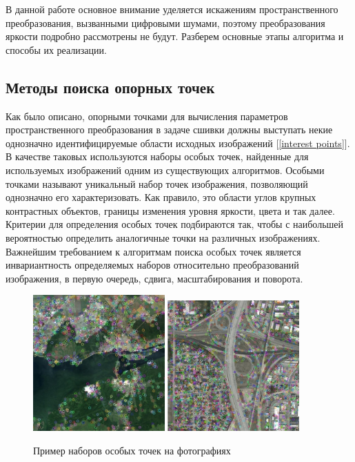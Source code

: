 {{	 В данной работе основное внимание уделяется искажениям пространственного преобразования, вызванными цифровыми шумами, поэтому преобразования яркости подробно рассмотрены не будут. 
	 Разберем основные этапы алгоритма и способы их реализации.
}
\subsection{Методы поиска опорных точек}{
	Как было описано, опорными точками для вычисления параметров пространственного преобразования в задаче сшивки должны выступать некие однозначно идентифицируемые области исходных изображений [\ref{interest points}]. В качестве таковых используются наборы особых точек, найденные для используемых изображений одним из существующих алгоритмов.
	Особыми точками называют уникальный набор точек изображения, позволяющий однозначно его характеризовать. Как правило, это области углов крупных контрастных объектов, границы изменения уровня яркости, цвета и так далее. Критерии для определения особых точек подбираются так, чтобы с наибольшей вероятностью определить аналогичные точки на различных изображениях.
	Важнейшим требованием к алгоритмам поиска особых точек является инвариантность определяемых наборов относительно преобразований изображения, в первую очередь, сдвига, масштабирования и поворота.
	
	\begin{figure}[H]
		\centering                             
		\includegraphics[width=0.45\textwidth,height=0.45\textwidth,]{keypoints/dam.jpg} 
		\includegraphics[width=0.45\textwidth,keepaspectratio]{keypoints/roads.jpg}                
		\centering\caption{ Пример наборов особых точек на фотографиях }
		\label{kps 1}                           
	\end{figure}    
	
}}
